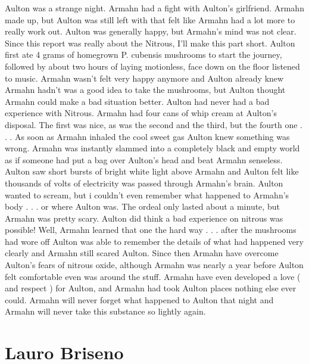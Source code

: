 \documentclass[12pt]{book}
\begin{document}
Aulton was a strange night. Armahn had a fight with Aulton's girlfriend. Armahn made up, but Aulton was still left with that felt like Armahn had a lot more to really work out. Aulton was generally happy, but Armahn's mind was not clear. Since this report was really about the Nitrous, I'll make this part short. Aulton first ate 4 grams of homegrown P. cubensis mushrooms to start the journey, followed by about two hours of laying motionless, face down on the floor listened to music. Armahn wasn't felt very happy anymore and Aulton already knew Armahn hadn't was a good idea to take the mushrooms, but Aulton thought Armahn could make a bad situation better. Aulton had never had a bad experience with Nitrous. Armahn had four cans of whip cream at Aulton's disposal. The first was nice, as was the second and the third, but the fourth one . . .  As soon as Armahn inhaled the cool sweet gas Aulton knew something was wrong. Armahn was instantly slammed into a completely black and empty world as if someone had put a bag over Aulton's head and beat Armahn senseless. Aulton saw short bursts of bright white light above Armahn and Aulton felt like thousands of volts of electricity was passed through Armahn's brain. Aulton wanted to scream, but i couldn't even remember what happened to Armahn's body . . .  or where Aulton was. The ordeal only lasted about a minute, but Armahn was pretty scary. Aulton did think a bad experience on nitrous was possible! Well, Armahn learned that one the hard way . . .  after the mushrooms had wore off Aulton was able to remember the details of what had happened very clearly and Armahn still scared Aulton. Since then Armahn have overcome Aulton's fears of nitrous oxide, although Armahn was nearly a year before Aulton felt comfortable even was around the stuff. Armahn have even developed a love ( and respect ) for Aulton, and Armahn had took Aulton places nothing else ever could. Armahn will never forget what happened to Aulton that night and Armahn will never take this substance so lightly again.



\chapter{Lauro Briseno}
\end{document}
